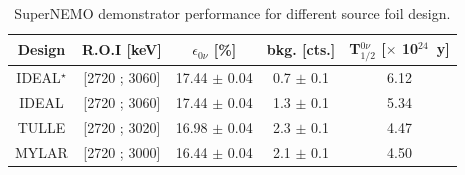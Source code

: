 \documentclass[main.tex]{subfiles}
\begin{document}
\begin{table}
\centering
\begin{tabular}{c|c|c|c|c}
\toprule
Design & R.O.I [keV] & $\epsilon_{\text{0}\nu}$ [\%] & bkg. [cts.] &   T$_{\text{1/2}}^{\text{0}\nu}$ [$\times$ 10$^{\text{24}}$~y] \\[0.1cm]
\hline
IDEAL$^{\star}$ & [2720 ; 3060] & 17.44 $\pm$ 0.04 & 0.7 $\pm$ 0.1 & 6.12 \\  [0.1cm]
\hline
IDEAL           & [2720 ; 3060] & 17.44 $\pm$ 0.04 & 1.3 $\pm$ 0.1 & 5.34 \\  [0.1cm]
\hline
TULLE           & [2720 ; 3020] & 16.98 $\pm$ 0.04 & 2.3 $\pm$ 0.1 & 4.47 \\  [0.1cm]
\hline
MYLAR           & [2720 ; 3000] & 16.44 $\pm$ 0.04 & 2.1 $\pm$ 0.1 & 4.50 \\  [0.1cm]
\bottomrule
\end{tabular}
\caption{SuperNEMO demonstrator performance for different source foil design.}
\label{SNperformanceDiffDesign}
\end{table}
\end{document}

